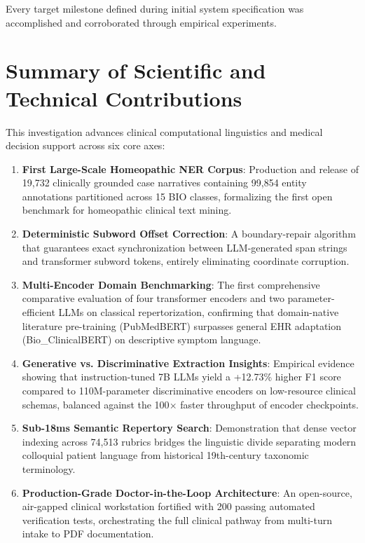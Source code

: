 Every target milestone defined during initial system specification was accomplished and corroborated through empirical experiments.


\section{Summary of Scientific and Technical Contributions}

This investigation advances clinical computational linguistics and medical decision support across six core axes:

\begin{enumerate}
  \item \textbf{First Large-Scale Homeopathic NER Corpus}: Production and release of 19,732 clinically grounded case narratives containing 99,854 entity annotations partitioned across 15 BIO classes, formalizing the first open benchmark for homeopathic clinical text mining.
  \item \textbf{Deterministic Subword Offset Correction}: A boundary-repair algorithm that guarantees exact synchronization between LLM-generated span strings and transformer subword tokens, entirely eliminating coordinate corruption.
  \item \textbf{Multi-Encoder Domain Benchmarking}: The first comprehensive comparative evaluation of four transformer encoders and two parameter-efficient LLMs on classical repertorization, confirming that domain-native literature pre-training (PubMedBERT) surpasses general EHR adaptation (Bio\_ClinicalBERT) on descriptive symptom language.
  \item \textbf{Generative vs. Discriminative Extraction Insights}: Empirical evidence showing that instruction-tuned 7B LLMs yield a +12.73\% higher F1 score compared to 110M-parameter discriminative encoders on low-resource clinical schemas, balanced against the 100$\times$ faster throughput of encoder checkpoints.
  \item \textbf{Sub-18ms Semantic Repertory Search}: Demonstration that dense vector indexing across 74,513 rubrics bridges the linguistic divide separating modern colloquial patient language from historical 19th-century taxonomic terminology.
  \item \textbf{Production-Grade Doctor-in-the-Loop Architecture}: An open-source, air-gapped clinical workstation fortified with 200 passing automated verification tests, orchestrating the full clinical pathway from multi-turn intake to PDF documentation.
\end{enumerate}

